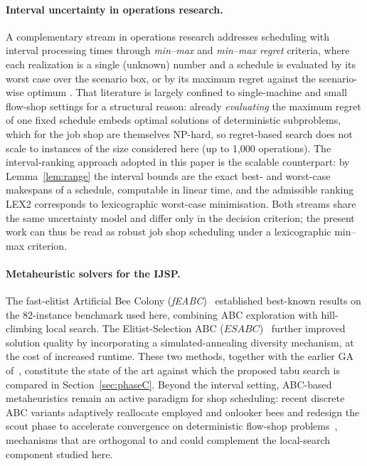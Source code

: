\documentclass[preprint,12pt]{elsarticle}
\begin{document}
\paragraph{Interval uncertainty in operations research.}
A complementary stream in operations research addresses scheduling with interval processing times through \emph{min--max} and \emph{min--max regret} criteria, where each realization is a single (unknown) number and a schedule is evaluated by its worst case over the scenario box, or by its maximum regret against the scenario-wise optimum \cite{KouvelisYu1997,Averbakh2001,Kasperski2008,KasperskiZielinski2016}. That literature is largely confined to single-machine and small flow-shop settings for a structural reason: already \emph{evaluating} the maximum regret of one fixed schedule embeds optimal solutions of deterministic subproblems, which for the job shop are themselves NP-hard, so regret-based search does not scale to instances of the size considered here (up to 1{,}000 operations). The interval-ranking approach adopted in this paper is the scalable counterpart: by Lemma~\ref{lem:range} the interval bounds are the exact best- and worst-case makespans of a schedule, computable in linear time, and the admissible ranking LEX2 corresponds to lexicographic worst-case minimisation. Both streams share the same uncertainty model and differ only in the decision criterion; the present work can thus be read as robust job shop scheduling under a lexicographic min--max criterion.

\paragraph{Metaheuristic solvers for the IJSP.}
The fast-elitist Artificial Bee Colony (\emph{fEABC})~\cite{DiazFEABC2023} established best-known results on the 82-instance benchmark used here, combining ABC exploration with hill-climbing local search. The Elitist-Selection ABC ($ESABC$)~\cite{DiazICAE2023} further improved solution quality by incorporating a simulated-annealing diversity mechanism, at the cost of increased runtime. These two methods, together with the earlier GA of~\cite{DiazIPMU2020}, constitute the state of the art against which the proposed tabu search is compared in Section~\ref{sec:phaseC}. Beyond the interval setting, ABC-based metaheuristics remain an active paradigm for shop scheduling: recent discrete ABC variants adaptively reallocate employed and onlooker bees and redesign the scout phase to accelerate convergence on deterministic flow-shop problems~\cite{Li2024}, mechanisms that are orthogonal to and could complement the local-search component studied here.
\end{document}
